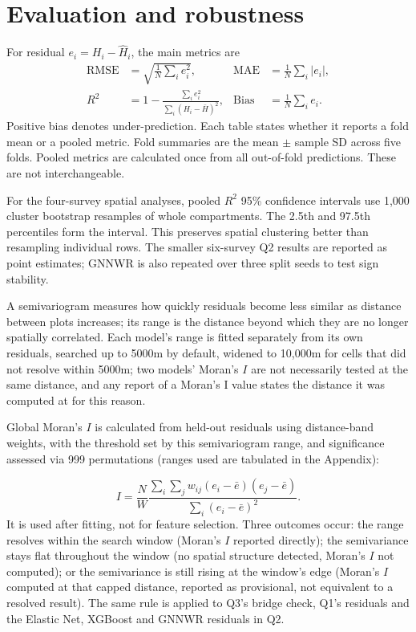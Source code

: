 \section{Evaluation and robustness}
\label{sec:eval-robustness}

For residual $e_i=H_i-\hat H_i$, the main metrics are
\begin{align}
\mathrm{RMSE}&=\sqrt{\frac{1}{N}\sum_i e_i^2}, &
\mathrm{MAE}&=\frac{1}{N}\sum_i|e_i|, \\
R^2&=1-\frac{\sum_i e_i^2}{\sum_i(H_i-\bar H)^2}, &
\mathrm{Bias}&=\frac{1}{N}\sum_i e_i.
\end{align}
Positive bias denotes under-prediction. Each table states whether it reports a fold mean or a
pooled metric. Fold summaries are the mean $\pm$ sample SD across five folds. Pooled metrics are
calculated once from all out-of-fold predictions. These are not interchangeable.

For the four-survey spatial analyses, pooled $R^2$ 95\% confidence intervals use 1,000 cluster bootstrap resamples of whole compartments. The 2.5th and 97.5th percentiles form the interval. This preserves spatial clustering better than resampling individual rows. The smaller six-survey Q2 results are reported as point estimates; GNNWR is also repeated over three split seeds to test sign stability.

A semivariogram measures how quickly residuals become less similar as distance between plots increases; its range is the distance beyond which they are no longer spatially correlated. Each model's range is fitted separately from its own residuals, searched up to 5000m by default, widened to 10,000m for cells that did not resolve within 5000m; two models' Moran's $I$ are not necessarily tested at the same distance, and any report of a Moran's I value states the distance it was computed at for this reason.

Global Moran's $I$ is calculated from held-out residuals using distance-band weights, with the threshold set by this semivariogram range, and significance assessed via 999 permutations (ranges used are tabulated in the Appendix):

\begin{equation}
I=\frac{N}{W}
\frac{\sum_i\sum_j w_{ij}(e_i-\bar e)(e_j-\bar e)}
{\sum_i(e_i-\bar e)^2}.
\label{eq:morans-i}
\end{equation}
It is used after fitting, not for feature selection.
Three outcomes occur: the range resolves within the search window (Moran's $I$ reported directly); the semivariance stays flat throughout the window (no spatial structure detected, Moran's $I$ not computed); or the semivariance is still rising at the window's edge (Moran's $I$ computed at that capped distance, reported as provisional, not equivalent to a resolved result). The same rule is applied to Q3's bridge check, Q1's residuals and the Elastic Net, XGBoost and GNNWR residuals in Q2.

